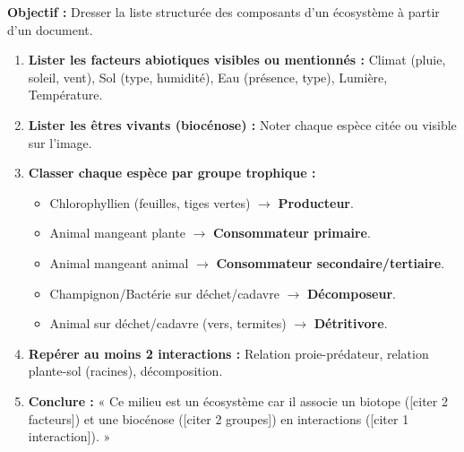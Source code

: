 \documentclass[11pt]{article}
\begin{document}
\begin{methode}
\textbf{Objectif :} Dresser la liste structurée des composants d'un écosystème à partir d'un document.
\begin{enumerate}
    \item \textbf{Lister les facteurs abiotiques visibles ou mentionnés :} Climat (pluie, soleil, vent), Sol (type, humidité), Eau (présence, type), Lumière, Température.
    \item \textbf{Lister les êtres vivants (biocénose) :} Noter chaque espèce citée ou visible sur l'image.
    \item \textbf{Classer chaque espèce par groupe trophique :}
    \begin{itemize}
        \item Chlorophyllien (feuilles, tiges vertes) $\to$ \textbf{Producteur}.
        \item Animal mangeant plante $\to$ \textbf{Consommateur primaire}.
        \item Animal mangeant animal $\to$ \textbf{Consommateur secondaire/tertiaire}.
        \item Champignon/Bactérie sur déchet/cadavre $\to$ \textbf{Décomposeur}.
        \item Animal sur déchet/cadavre (vers, termites) $\to$ \textbf{Détritivore}.
    \end{itemize}
    \item \textbf{Repérer au moins 2 interactions :} Relation proie-prédateur, relation plante-sol (racines), décomposition.
    \item \textbf{Conclure :} « Ce milieu est un écosystème car il associe un biotope ([citer 2 facteurs]) et une biocénose ([citer 2 groupes]) en interactions ([citer 1 interaction]). »
\end{enumerate}
\end{methode}
\end{document}
